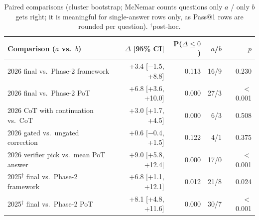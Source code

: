 \begin{table}[!t]
\centering
\scriptsize
\caption{Paired comparisons (cluster bootstrap; McNemar counts questions only $a$ / only $b$ gets right; it is meaningful for single-answer rows only, as Pass@1 rows are rounded per question). $^\dagger$post-hoc.}
\label{tab:cmp}
\setlength{\tabcolsep}{2.5pt}
\begin{tabular}{lrrrr}
\toprule
Comparison ($a$ vs.\ $b$) & $\Delta$ [95\% CI] & P($\Delta{\le}0$) & $a$/$b$ & $p$ \\
\midrule
2026 final vs.\ Phase-2 framework & +3.4 [$-$1.5, +8.8] & 0.113 & 16/9 & 0.230 \\
2026 final vs.\ Phase-2 PoT & +6.8 [+3.6, +10.0] & 0.000 & 27/3 & $<$0.001 \\
2026 CoT with continuation vs.\ CoT & +3.0 [+1.7, +4.5] & 0.000 & 6/3 & 0.508 \\
2026 gated vs.\ ungated correction & +0.6 [$-$0.4, +1.5] & 0.122 & 4/1 & 0.375 \\
2026 verifier pick vs.\ mean PoT answer & +9.0 [+5.8, +12.4] & 0.000 & 17/0 & $<$0.001 \\
2025$^\dagger$ final vs.\ Phase-2 framework & +6.8 [+1.1, +12.1] & 0.012 & 21/8 & 0.024 \\
2025$^\dagger$ final vs.\ Phase-2 PoT & +8.1 [+4.8, +11.6] & 0.000 & 30/7 & $<$0.001 \\
\bottomrule
\end{tabular}
\end{table}
